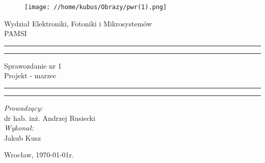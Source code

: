 \begin{titlepage}
\begin{figure}
	\centering
	\texttt{[image: //home/kubus/Obrazy/pwr(1).png]}
	
	\label{fig:pwr}
\end{figure}
	\begin{center}
		\huge Wydział Elektroniki, Fotoniki i Mikrosystemów \\ 
		\vspace{40pt}
		\huge PAMSI  \\
	\end{center}
	\vspace{60pt}
	\hrule
	\vspace{1pt}
	\hrule
	\begin{center}
		{\fontsize{40}{50}\selectfont Sprawozdanie nr 1\\ }
		\vspace{10pt}
		{\fontsize{25}{25}\selectfont Projekt - marzec  }
	\end{center}
	\hrule
	\vspace{1pt}
	\hrule
	\begin{flushright}
		\vspace{65pt}
		\textit{\Large Prowadzący:}\\
		
		\Large dr hab. inż. Andrzej Rusiecki\\
		\vspace{10pt}
		\textit{\Large Wykonał:}\\
		
		\Large Jakub Kusz \\
	
	\end{flushright}
	\vspace{100pt}
	\begin{center}
		\large Wrocław, \today r.
	\end{center}
\end{titlepage}

